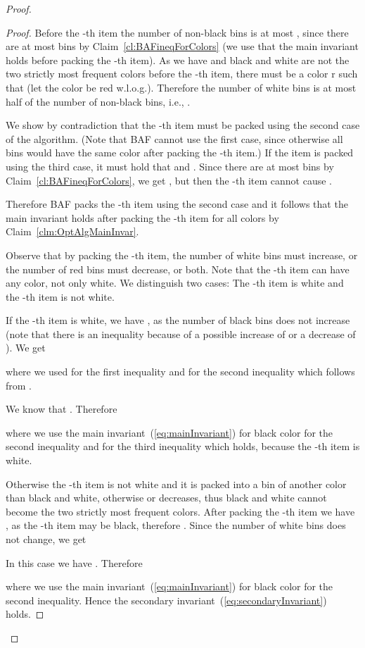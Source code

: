\documentclass[11pt,a4paper]{article}
\begin{document}
\begin{proof}
\begin{proof}
Before the -th item the number of non-black bins is at most
,
since there are at most  bins by Claim~\ref{cl:BAFineqForColors}
(we use that the main invariant holds before packing the -th item).
As we have  and
black and white are not the two strictly most frequent colors before the -th item,
there must be a color r  such that 
(let the color be red w.l.o.g.). Therefore the number of white bins is at most half of the number of non-black bins,
i.e., .

We show by contradiction that the -th item must be packed using the second case of the algorithm.
(Note that BAF cannot use the first case, since otherwise all bins would have the same color after
packing the -th item.)
If the item is packed using the third case, it must hold that
 and .
Since there are at most  bins by Claim~\ref{cl:BAFineqForColors},
we get , but then the -th item
cannot cause .

Therefore BAF packs the -th item using the second case
and it follows that the main invariant holds after packing the -th item for all colors
by Claim~\ref{clm:OptAlgMainInvar}.

Observe that by packing the -th item, the number of white bins must increase,
or the number of red bins must decrease, or both.
Note that the -th item can have any color, not only white. 
We distinguish two cases: The -th item is white
and the -th item is not white.

If the -th item is white,
we have , as the number of black bins does not increase
(note that there is an inequality because of a possible increase of  or a decrease of ).
We get


where we used  for the first inequality and
 for the second inequality
which follows from .

We know that
.
Therefore

where we use the main invariant~(\ref{eq:mainInvariant}) for black color for the second inequality
and  for the third inequality which holds, because the -th item is white.

Otherwise the -th item is not white and it is packed into a bin of another color than black and white,
otherwise  or  decreases, thus black
and white cannot become the two strictly most frequent colors. After packing the -th item
we have , as the -th item may be black,
therefore .
Since the number of white bins does not change, we get


In this case we have .
Therefore

where we use the main invariant~(\ref{eq:mainInvariant}) for black color for the second inequality.
Hence the secondary invariant~(\ref{eq:secondaryInvariant}) holds.
\end{proof}


\end{proof}
\end{document}
